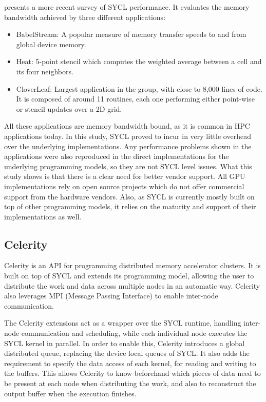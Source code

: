 \cite{sycl_hpc_applications} presents a more recent survey of SYCL performance. It evaluates the memory bandwidth achieved by three different applications:
\begin{itemize}
    \item BabelStream: A popular measure of memory transfer speeds to and from global device memory.
    \item Heat: 5-point stencil which computes the weighted average between a cell and its four neighbors.
    \item CloverLeaf: Largest application in the group, with close to 8,000 lines of code. It is composed of around 11 routines, each one performing either point-wise or stencil updates over a 2D grid.
\end{itemize}
All these applications are memory bandwidth bound, as it is common in HPC applications today.
In this study, SYCL proved to incur in very little overhead over the underlying implementations. Any performance problems shown in the applications were also reproduced in the direct implementations for the underlying programming models, so they are not SYCL level issues. What this study shows is that there is a clear need for better vendor support. All GPU implementations rely on open source projects which do not offer commercial support from the hardware vendors. Also, as SYCL is currently mostly built on top of other programming models, it relies on the maturity and support of their implementations as well.

\subsection{Celerity}
Celerity \cite{celerity} is an API for programming distributed memory accelerator clusters. It is built on top of SYCL and extends its programming model, allowing the user to distribute the work and data across multiple nodes in an automatic way. Celerity also leverages MPI (Message Passing Interface) \cite{mpi} to enable inter-node communication.

The Celerity extensions act as a wrapper over the SYCL runtime, handling inter-node communication and scheduling, while each individual node executes the SYCL kernel in parallel. In order to enable this, Celerity introduces a global distributed queue, replacing the device local queues of SYCL. It also adds the requirement to specify the data access of each kernel, for reading and writing to the buffers. This allows Celerity to know beforehand which pieces of data need to be present at each node when distributing the work, and also to reconstruct the output buffer when the execution finishes.

